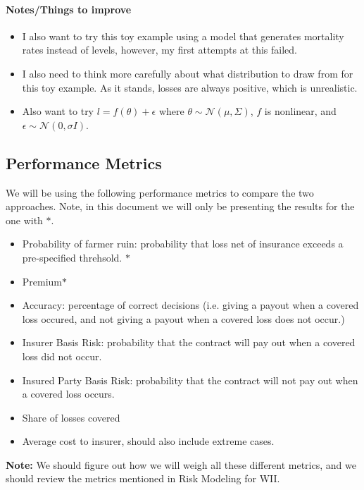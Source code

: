 \documentclass[11pt]{article}
\begin{document}
    \paragraph*{Notes/Things to improve}
    \begin{itemize}
      \item I also want to try this toy example using a model that generates mortality rates instead of levels, however, my first attempts at this failed.
      \item I also need to think more carefully about what distribution to draw from for this toy example. As it stands, losses are always positive, which is unrealistic.
      \item Also want to try $l= f(\theta) + \epsilon$ where $\theta \sim \mathcal{N}(\mu,\Sigma)$, $f$ is nonlinear, and $\epsilon \sim \mathcal{N}(0,\sigma I)$.
    \end{itemize}

    \subsection*{Performance Metrics}
    We will be using the following performance metrics to compare the two approaches. Note, in this document we will only be presenting the results for the one with $*$. 
    \begin{itemize}
        \item Probability of farmer ruin: probability that loss net of insurance exceeds a pre-specified threhsold. $*$
        \item Premium$*$
        \item Accuracy: percentage of correct decisions (i.e. giving a payout when a covered loss occured, and not giving a payout when a covered loss does not occur.)
        \item Insurer Basis Risk: probability that the contract will pay out when a covered loss did not occur.
        \item Insured Party Basis Risk: probability that the contract will not pay out when a covered loss occurs. 
        \item Share of losses covered
        \item Average cost to insurer, should also include extreme cases.
    \end{itemize}

    \textbf{Note:} We should figure out how we will weigh all these different metrics, and we should review the metrics mentioned in Risk Modeling for WII.
\end{document}

